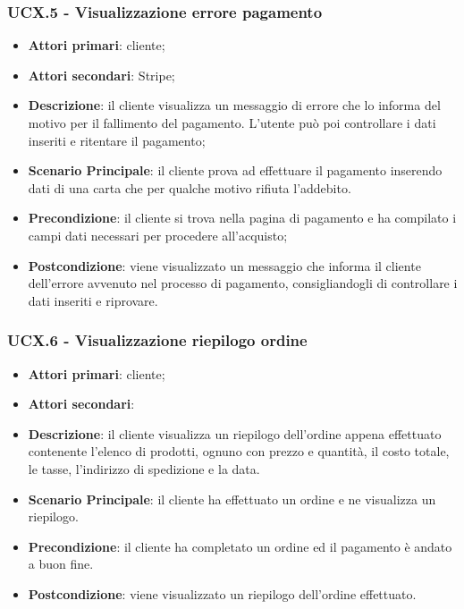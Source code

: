 \subsubsection{UCX.5 - Visualizzazione errore pagamento}
\begin{itemize}
\item \textbf{Attori primari}: cliente;
\item \textbf{Attori secondari}: Stripe;
\item \textbf{Descrizione}: il cliente visualizza un messaggio di errore che lo informa del motivo per il fallimento del pagamento. L'utente può poi controllare i dati inseriti e ritentare il pagamento;
\item \textbf{Scenario Principale}: il cliente prova ad effettuare il pagamento inserendo dati di una carta che per qualche motivo rifiuta l'addebito.
\item \textbf{Precondizione}: il cliente si trova nella pagina di pagamento e ha compilato i campi dati necessari per procedere all'acquisto;
\item \textbf{Postcondizione}: viene visualizzato un messaggio che informa il cliente dell'errore avvenuto nel processo di pagamento, consigliandogli di controllare i dati inseriti e riprovare.
\end{itemize}

\subsubsection{UCX.6 - Visualizzazione riepilogo ordine}
\begin{itemize}
\item \textbf{Attori primari}: cliente;
\item \textbf{Attori secondari}:
\item \textbf{Descrizione}: il cliente visualizza un riepilogo dell'ordine appena effettuato contenente l'elenco di prodotti, ognuno con prezzo e quantità, il costo totale, le tasse, l'indirizzo di spedizione e la data.
\item \textbf{Scenario Principale}: il cliente ha effettuato un ordine e ne visualizza un riepilogo.
\item \textbf{Precondizione}: il cliente ha completato un ordine ed il pagamento è andato a buon fine.
\item \textbf{Postcondizione}: viene visualizzato un riepilogo dell'ordine effettuato.
\end{itemize}

